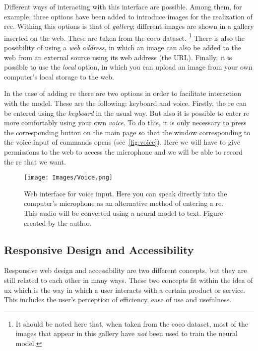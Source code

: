 Different ways of interacting with this interface are possible. Among them, for
example, three options have been added to introduce images for the realization
of \gls{rec}. Withing this options is that of \emph{gallery}; different images
are shown in a gallery inserted on the web. These are taken from the \gls{coco}
dataset.%
\footnote{It should be noted here that, when taken from the \gls{coco} dataset,
  most of the images that appear in this gallery have \emph{not} been used to
  train the neural model.} There is also the possibility of using a \emph{web
  address}, in which an image can also be added to the web from an external
source using its web address (the URL). Finally, it is possible to use the
\emph{local} option, in which you can upload an image from your own computer's
local storage to the web.

In the case of adding \gls{re} there are two options in order to facilitate
interaction with the model. These are the following: keyboard and
voice. Firstly, the \gls{re} can be entered using the \emph{keyboard} in the
usual way. But also it is possible to enter \gls{re} more comfortably using
your own \emph{voice}. To do this, it is only necessary to press the
corresponding button on the main page so that the window corresponding to the
voice input of commands opens (see\ \vref{fig:voice}). Here we will have to
give permissions to the web to access the microphone and we will be able to
record the \gls{re} that we want.

\begin{figure}[ht]
  \centering
  \texttt{[image: Images/Voice.png]}
  \caption[Web interface for voice input]{Web interface for voice input. Here
    you can speak directly into the computer's microphone as an alternative
    method of entering a \gls{re}. This audio will be converted using a
    neural model to text. Figure created by the author.}%
  \label{fig:voice}
\end{figure}


\subsection{Responsive Design and Accessibility}%

Responsive web design and accessibility are two different concepts, but they
are still related to each other in many ways. These two concepts fit within the
idea of \gls{ux} which is the way in which a user
interacts with a certain product or service. This includes the user's
perception of efficiency, ease of use and usefulness.

